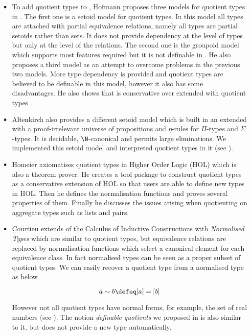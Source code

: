 \begin{itemize}
\item To add quotient types to \mltt, Hofmann proposes three models
  for quotient types in \cite{hof:phd}. The first one is a setoid
  model for quotient types. In this model all types are attached with
  partial equivalence relations, namely all types are partial setoids
  rather than sets. It does not provide dependency at the level of
  types but only at the level of the relations.
The second one is the groupoid model which supports most features
required but it is not definable in \itt.  He also proposes a third
model as an attempt to overcome problems in the previous two
models. More type dependency is provided and quotient types are
believed to be definable in this model, however it also has some
disadvantages. He also shows that \ett is conservative over \itt
extended with quotient types \cite{hof:95:con}.


\item Altenkirch \cite{alti:lics99} also provides a different setoid
  model which is built in an \itt extended with a proof-irrelevant
  universe of propositions and $\eta$-rules for $\Pi$-types and
  $\Sigma$-types. It is decidable, $\N$-canonical and permits large
  eliminations. We implemented this setoid model and interpreted
  quotient types in it (see ).

\item Homeier \cite{hom} axiomatises quotient types in Higher Order
  Logic (HOL) which is also a theorem prover. He creates a tool
  package to construct quotient types as a conservative extension of
  HOL so that users are able to define new types in HOL. Then he
  defines the normalisation functions and proves several properties of
  them. Finally he discusses the issues arising when quotienting on
  aggregate types such as lists and pairs.


\item Courtieu \cite{cou:01} extends of the Calculus of Inductive
  Constructions with \emph{Normalised Types} which are similar to
  quotient types, but equivalence relations are replaced by
  normalisation functions which select a canonical element for each
  equivalence class.  In fact normalised types can be seen as a proper
  subset of quotient types. We can easily recover a quotient type from
  a normalised type as below

$$a \sim b \defeq [ a ] = [ b ]$$

However not all quotient types have normal forms, for example, the set of real numbers (see ).
The notion \emph{definable quotients} we proposed in  is also similar to it, but does not provide a new type automatically.


\end{itemize}
